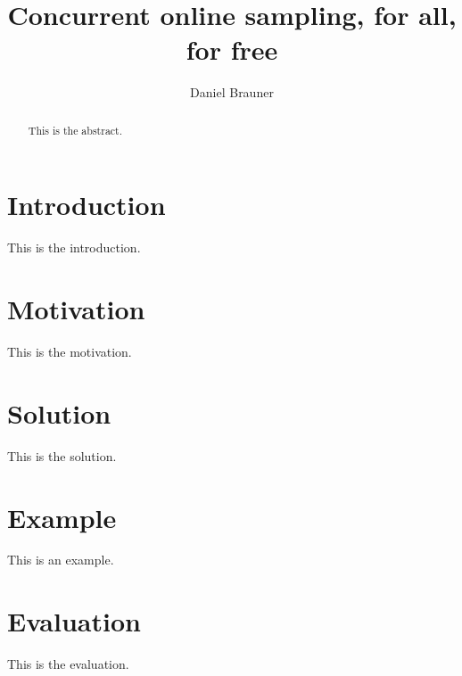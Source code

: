 \documentclass[acmlarge]{acmart}
\begin{document}
    \title{Concurrent online sampling, for all, for free}

    \author{Daniel Brauner}
    
    \begin{abstract}
        This is the abstract.
    \end{abstract}


    \maketitle

    \section{Introduction}
        This is the introduction.

    \section{Motivation} 
        This is the motivation.

    \section{Solution}
        This is the solution.
    
    \section{Example}
        This is an example.

    \section{Evaluation}
        This is the evaluation.
\end{document}
